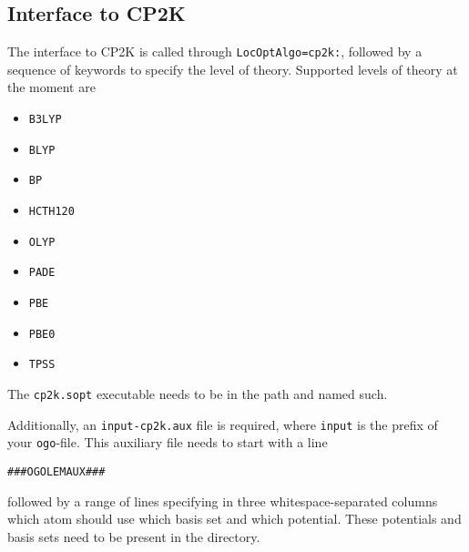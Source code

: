 \documentclass[a4paper,10pt]{scrbook}
\begin{document}
\subsection{Interface to CP2K}
The interface to CP2K is called through \texttt{LocOptAlgo=cp2k:}, followed
by a sequence of keywords to specify the level of theory. Supported levels of
theory at the moment are
\begin{itemize}
  \item \texttt{B3LYP}
  \item \texttt{BLYP}
  \item \texttt{BP}
  \item \texttt{HCTH120}
  \item \texttt{OLYP}
  \item \texttt{PADE}
  \item \texttt{PBE}
  \item \texttt{PBE0}
  \item \texttt{TPSS}
\end{itemize}

The \texttt{cp2k.sopt} executable needs to be in the path and named such.

Additionally, an \texttt{input-cp2k.aux} file is required, where \texttt{input}
is the prefix of your \texttt{ogo}-file. This auxiliary file needs to start
with a line
\begin{verbatim}
###OGOLEMAUX###
\end{verbatim}
followed by a range of lines specifying in three whitespace-separated columns
which atom should use which basis set and which potential. These potentials and
basis sets need to be present in the directory.
\end{document}

